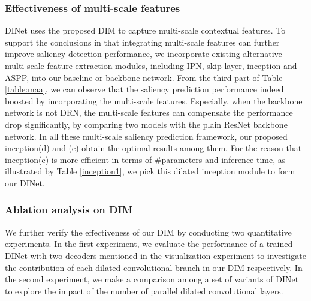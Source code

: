 \subsubsection{Effectiveness of multi-scale features} 

DINet uses the proposed DIM to capture multi-scale contextual features. To support the conclusions in \cite{huang2015salicon,kruthiventi2017deepfix,liu2016deep} that integrating multi-scale features can further improve saliency detection performance, we incorporate existing alternative multi-scale feature extraction modules, including IPN, skip-layer, inception and ASPP, into our baseline or backbone network. From the third part of Table \ref{table:maa}, we can observe that the saliency prediction performance indeed boosted by incorporating the multi-scale features. Especially, when the backbone network is not DRN, the multi-scale features can compensate the performance drop significantly, by comparing two models with the plain ResNet backbone network. In all these multi-scale saliency prediction framework, our proposed inception(d) and (e) obtain the optimal results among them. For the reason that inception(e) is more efficient in terms of \#parameters and inference time, as illustrated by Table \ref{inception1}, we pick this dilated inception module to form our DINet.


\subsubsection{Ablation analysis on DIM} 
 We further verify the effectiveness of our DIM by conducting two quantitative experiments. In the first experiment, we evaluate the performance of a trained DINet with two decoders mentioned in the visualization experiment to investigate the contribution of each dilated convolutional branch in our DIM respectively. In the second experiment, we make a comparison among a set of variants of DINet to explore the impact of the number of parallel dilated convolutional layers.





